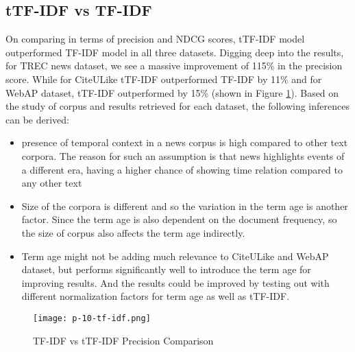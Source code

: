 \subsection{tTF-IDF vs TF-IDF}
On comparing in terms of precision and NDCG scores, tTF-IDF model outperformed TF-IDF model in all three datasets. Digging deep into the results, for TREC news dataset, we see a massive improvement of 115\% in the precision score. While for CiteULike tTF-IDF outperformed TF-IDF by 11\% and for WebAP dataset, tTF-IDF outperformed by 15\% (shown in Figure \ref{fig:tf-idf-precision-comparison}).
Based on the study of corpus and results retrieved for each dataset, the following inferences can be derived:
\begin{itemize}
    \item presence of temporal context in a news corpus is high compared to other text corpora. The reason for such an assumption is that news highlights events of a different era, having a higher chance of showing time relation compared to any other text
    \item Size of the corpora is different and so the variation in the term age is another factor. Since the term age is also dependent on the document frequency, so the size of corpus also affects the term age indirectly.
    \item Term age might not be adding much relevance to CiteULike and WebAP dataset, but performs significantly well to introduce the term age for improving results. And the results could be improved by testing out with different normalization factors for term age as well as tTF-IDF.
\end{itemize}
\begin{figure} [h!]
    \centering
    \texttt{[image: p-10-tf-idf.png]}
    \caption{TF-IDF vs tTF-IDF Precision Comparison}
    \label{fig:tf-idf-precision-comparison}
\end{figure}
